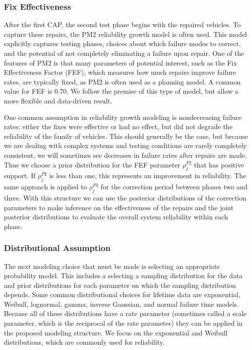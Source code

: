 \documentclass[12pt]{article}
\begin{document}
\subsubsection{Fix Effectiveness}
After the first CAP, the second test phase begins with the repaired vehicles. To capture
these repairs, the PM2 reliability growth model \cite{ref2} is often used.
This model explicitly captures testing phases, choices about which failure modes
to correct, and the potential of not completely eliminating a failure upon
repair. One of the features of PM2 is that many parameters of potential
interest, such as the Fix Effectiveness Factor (FEF), which measures how much
repairs improve failure rates, are typically fixed, as PM2 is often used as a planning model. A common value for FEF is
0.70. We follow the premise of this type of model, but allow a more flexible and
data-driven result.

One common assumption in reliability growth modeling is nondecreasing
failure rates: either the fixes were effective or had no effect, but did
not degrade the reliability of the family of vehicles.  This should generally be the case, but
because we are dealing with complex systems and testing conditions are rarely
completely consistent, we will sometimes see decreases in failure rates after repairs are made.  Thus we choose a prior distribution for the
FEF parameter $\rho_{j}^{P2}$ that has positive support.  If
$\rho_{j}^{P2}$ is less than one, this represents an improvement in reliability.
The same approach is applied to $\rho_{j}^{P3}$ for the correction period
between phases two and three.  With this structure we can use the posterior
distributions of the correction parameters to make inference on the effectiveness
of the repairs and the joint posterior distributions to evaluate the overall system reliability within each phase.

\subsubsection{Distributional Assumption}
The next modeling choice that must be made is selecting an appropriate
probability model. This includes a selecting a sampling distribution for the data
and prior distributions for each parameter on which the sampling distribution
depends. Some common distributional choices for lifetime data are exponential, Weibull, lognormal, gamma, inverse
Gaussian, and normal failure time models.  Because all of these distributions
have a rate parameter (sometimes called a scale parameter, which is the reciprocal of the rate parameter) they can be applied in
the proposed modeling structure. We focus on the
exponential and Weibull distributions, which are commonly used for reliability.
\end{document}
